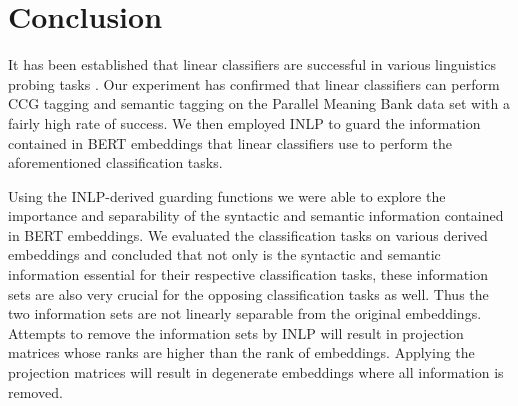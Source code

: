 \documentclass[11pt,a4paper]{article}
\begin{document}
        



\section{Conclusion}
\label{sec:conclusion}
It has been established that linear classifiers are successful in various linguistics probing tasks \citep{language-transfer}. Our experiment has confirmed that linear classifiers can perform CCG tagging and semantic tagging on the Parallel Meaning Bank data set \citep{pmbData} with a fairly high rate of success. We then employed INLP to guard the information contained in BERT embeddings that linear classifiers use to perform the aforementioned classification tasks.

Using the INLP-derived guarding functions we were able to explore the importance and separability of the syntactic and semantic information contained in BERT embeddings. We evaluated the classification tasks on various derived embeddings and concluded that not only is the syntactic and semantic information essential for their respective classification tasks, these information sets are also very crucial for the opposing classification tasks as well. Thus the two information sets are not linearly separable from the original embeddings. Attempts to remove the information sets by INLP will result in projection matrices whose ranks are higher than the rank of embeddings. Applying the projection matrices will result in degenerate embeddings where all information is removed.
\end{document}
